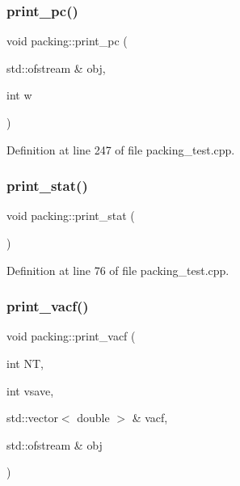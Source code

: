 \mbox{\label{classpacking_ac48b7b4764be70a7c3c9728687593f0e}} 
\subsubsection{\texorpdfstring{print\+\_\+pc()}{print\_pc()}}
{\footnotesize\ttfamily void packing\+::print\+\_\+pc (\begin{DoxyParamCaption}\item[{std\+::ofstream \&}]{obj,  }\item[{int}]{w }\end{DoxyParamCaption})}



Definition at line 247 of file packing\+\_\+test.\+cpp.

\mbox{\label{classpacking_a82af7804db28ae21d1b049190a4cc7d9}} 
\subsubsection{\texorpdfstring{print\+\_\+stat()}{print\_stat()}}
{\footnotesize\ttfamily void packing\+::print\+\_\+stat (\begin{DoxyParamCaption}{ }\end{DoxyParamCaption})}



Definition at line 76 of file packing\+\_\+test.\+cpp.

\mbox{\label{classpacking_a50f911bdce5d1a3c81bd73eb3a77fd0e}} 
\subsubsection{\texorpdfstring{print\+\_\+vacf()}{print\_vacf()}}
{\footnotesize\ttfamily void packing\+::print\+\_\+vacf (\begin{DoxyParamCaption}\item[{int}]{NT,  }\item[{int}]{vsave,  }\item[{std\+::vector$<$ double $>$ \&}]{vacf,  }\item[{std\+::ofstream \&}]{obj }\end{DoxyParamCaption})}



